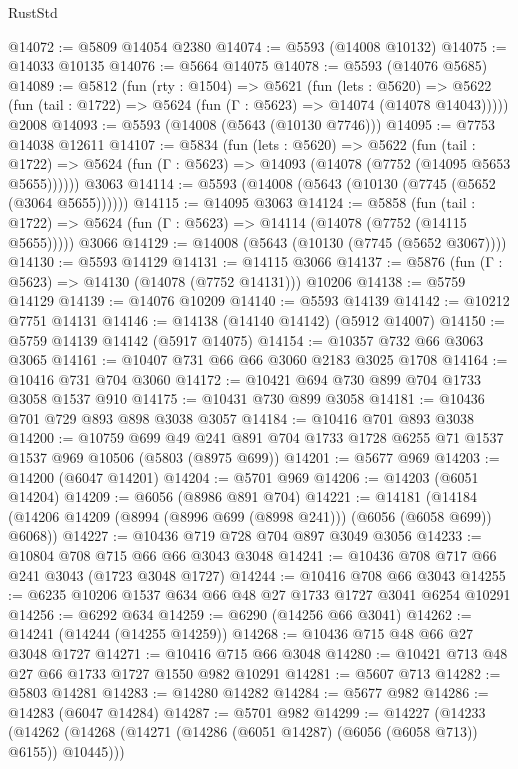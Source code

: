 \begin{lexlean}{RustStd}
\begin{coremodule}
@14072 := @5809 @14054 @2380
@14074 := @5593 (@14008 @10132)
@14075 := @14033 @10135
@14076 := @5664 @14075
@14078 := @5593 (@14076 @5685)
@14089 := @5812
    (fun (rty : @1504) =>
    @5621
      (fun (lets : @5620) =>
      @5622 (fun (tail : @1722) => @5624 (fun (Γ : @5623) => @14074 (@14078 @14043)))))
    @2008
@14093 := @5593 (@14008 (@5643 (@10130 @7746)))
@14095 := @7753 @14038 @12611
@14107 := @5834
    (fun (lets : @5620) =>
    @5622
      (fun (tail : @1722) =>
      @5624 (fun (Γ : @5623) => @14093 (@14078 (@7752 (@14095 @5653 @5655))))))
    @3063
@14114 := @5593 (@14008 (@5643 (@10130 (@7745 (@5652 (@3064 @5655))))))
@14115 := @14095 @3063
@14124 := @5858
    (fun (tail : @1722) => @5624 (fun (Γ : @5623) => @14114 (@14078 (@7752 (@14115 @5655)))))
    @3066
@14129 := @14008 (@5643 (@10130 (@7745 (@5652 @3067))))
@14130 := @5593 @14129
@14131 := @14115 @3066
@14137 := @5876 (fun (Γ : @5623) => @14130 (@14078 (@7752 @14131))) @10206
@14138 := @5759 @14129
@14139 := @14076 @10209
@14140 := @5593 @14139
@14142 := @10212 @7751 @14131
@14146 := @14138 (@14140 @14142) (@5912 @14007)
@14150 := @5759 @14139 @14142 (@5917 @14075)
@14154 := @10357 @732 @66 @3063 @3065
@14161 := @10407 @731 @66 @66 @3060 @2183 @3025 @1708
@14164 := @10416 @731 @704 @3060
@14172 := @10421 @694 @730 @899 @704 @1733 @3058 @1537 @910
@14175 := @10431 @730 @899 @3058
@14181 := @10436 @701 @729 @893 @898 @3038 @3057
@14184 := @10416 @701 @893 @3038
@14200 := @10759
    @699
    @49
    @241
    @891
    @704
    @1733
    @1728
    @6255
    @71
    @1537
    @1537
    @969
    @10506
    (@5803 (@8975 @699))
@14201 := @5677 @969
@14203 := @14200 (@6047 @14201)
@14204 := @5701 @969
@14206 := @14203 (@6051 @14204)
@14209 := @6056 (@8986 @891 @704)
@14221 := @14181
    (@14184 (@14206 @14209 (@8994 (@8996 @699 (@8998 @241))) (@6056 (@6058 @699)) @6068))
@14227 := @10436 @719 @728 @704 @897 @3049 @3056
@14233 := @10804 @708 @715 @66 @66 @3043 @3048
@14241 := @10436 @708 @717 @66 @241 @3043 (@1723 @3048 @1727)
@14244 := @10416 @708 @66 @3043
@14255 := @6235 @10206 @1537 @634 @66 @48 @27 @1733 @1727 @3041 @6254 @10291
@14256 := @6292 @634
@14259 := @6290 (@14256 @66 @3041)
@14262 := @14241 (@14244 (@14255 @14259))
@14268 := @10436 @715 @48 @66 @27 @3048 @1727
@14271 := @10416 @715 @66 @3048
@14280 := @10421 @713 @48 @27 @66 @1733 @1727 @1550 @982 @10291
@14281 := @5607 @713
@14282 := @5803 @14281
@14283 := @14280 @14282
@14284 := @5677 @982
@14286 := @14283 (@6047 @14284)
@14287 := @5701 @982
@14299 := @14227
    (@14233 (@14262 (@14268 (@14271 (@14286 (@6051 @14287) (@6056 (@6058 @713)) @6155)) @10445)))

\end{coremodule}
\end{lexlean}
